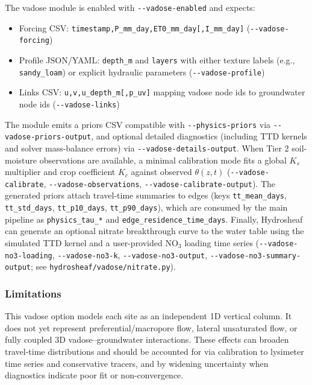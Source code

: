 \documentclass[12pt,a4paper]{article}
\theoremstyle{plain}
\theoremstyle{definition}
\theoremstyle{remark}
\begin{document}
The vadose module is enabled with \nolinkurl{--vadose-enabled} and expects:
\begin{itemize}
	\item Forcing CSV: \nolinkurl{timestamp,P_mm_day,ET0_mm_day[,I_mm_day]} (\nolinkurl{--vadose-forcing})
	\item Profile JSON/YAML: \nolinkurl{depth_m} and \nolinkurl{layers} with either texture labels (e.g., \nolinkurl{sandy_loam}) or explicit hydraulic parameters (\nolinkurl{--vadose-profile})
	\item Links CSV: \nolinkurl{u,v,u_depth_m[,p_uv]} mapping vadose node ids to groundwater node ids (\nolinkurl{--vadose-links})
\end{itemize}
The module emits a priors CSV compatible with \nolinkurl{--physics-priors} via \nolinkurl{--vadose-priors-output}, and optional detailed diagnostics (including TTD kernels and solver mass-balance errors) via \nolinkurl{--vadose-details-output}. When Tier 2 soil-moisture observations are available, a minimal calibration mode fits a global $K_s$ multiplier and crop coefficient $K_c$ against observed $\theta(z,t)$ (\nolinkurl{--vadose-calibrate}, \nolinkurl{--vadose-observations}, \nolinkurl{--vadose-calibrate-output}). The generated priors attach travel-time summaries to edges (keys \texttt{tt\_mean\_days}, \texttt{tt\_std\_days}, \texttt{tt\_p10\_days}, \texttt{tt\_p90\_days}), which are consumed by the main pipeline as \texttt{physics\_tau\_*} and \texttt{edge\_residence\_time\_days}. Finally, Hydrosheaf can generate an optional nitrate breakthrough curve to the water table using the simulated TTD kernel and a user-provided NO$_3$ loading time series (\nolinkurl{--vadose-no3-loading}, \nolinkurl{--vadose-no3-k}, \nolinkurl{--vadose-no3-output}, \nolinkurl{--vadose-no3-summary-output}; see \nolinkurl{hydrosheaf/vadose/nitrate.py}).

\subsubsection{Limitations}

This vadose option models each site as an independent 1D vertical column. It does not yet represent preferential/macropore flow, lateral unsaturated flow, or fully coupled 3D vadose--groundwater interactions. These effects can broaden travel-time distributions and should be accounted for via calibration to lysimeter time series and conservative tracers, and by widening uncertainty when diagnostics indicate poor fit or non-convergence.
\end{document}
